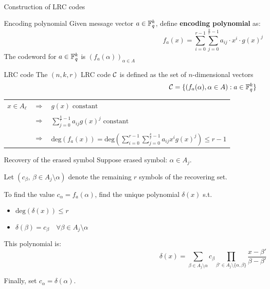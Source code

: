     \begin{frame}{Construction of LRC codes}
        \begin{block}{Encoding polynomial}
            Given message vector $a \in \mathbb{F}_q^k$, define \textbf{encoding polynomial} as:
            $$ f_a(x) = \sum_{i=0}^{r-1} \sum_{j=0}^{\frac{k}{r}-1} a_{ij} \cdot  x^i \cdot g(x)^j $$
            The codeword for $a \in \mathbb{F}_q^k$ is $(f_a(\alpha))_{\alpha \in A}$
        \end{block}
        \begin{block}{LRC code}
            The $(n,k,r)$ LRC code $\mathcal{C}$ is defined as the set of $n$-dimensional vectors
            $$\mathcal{C} = \{ (f_a(\alpha), \alpha \in A) : a \in \mathbb{F}_q^k \}$$
        \end{block}
    \end{frame}
    

\begin{frame}
    \begin{rmk}
        \begin{tabular}{ccl}
        $x \in A_\ell$ & $\Rightarrow$ & $g(x) \mbox{ constant}$ \\
        & & \\
        & $\Rightarrow$ & $\sum_{j=0}^{\frac{k}{r}-1} a_{i j} g(x)^j \mbox{ constant}$ \\
        & & \\
        & $\Rightarrow$ & $\text{deg}(f_a(x)) = \text{deg}(\sum_{i=0}^{r-1}\sum_{j=0}^{\frac{k}{r}-1} a_{ij} x^i g(x)^j) \leq r-1$
        \end{tabular}
    \end{rmk}
\end{frame}

\begin{frame}{Recovery of the erased symbol}
    Suppose erased symbol: $\alpha \in A_j$.
    
    Let $\left( c_{\beta}, \ \beta \in A_j \setminus \alpha \right)$ denote the remaining $r$ symbols of the recovering set.
    
    To find the value $c_{\alpha} = f_a(\alpha)$, find the unique polynomial $\delta(x)$ s.t.
    \begin{itemize}
        \item $\text{deg}(\delta(x)) \leq r$
        \item $\delta(\beta) = c_{\beta} \quad \forall \beta \in A_j \setminus \alpha$
    \end{itemize}
    
    This polynomial is:
    $$\delta(x) = \sum_{\beta \in A_j \setminus \alpha} c_{\beta} \prod_{\beta ' \in A_j \setminus \{\alpha, \beta\}} \frac{x - \beta'}{\beta - \beta '}$$

    Finally, set $c_{\alpha} = \delta(\alpha)$.
    
\end{frame}

